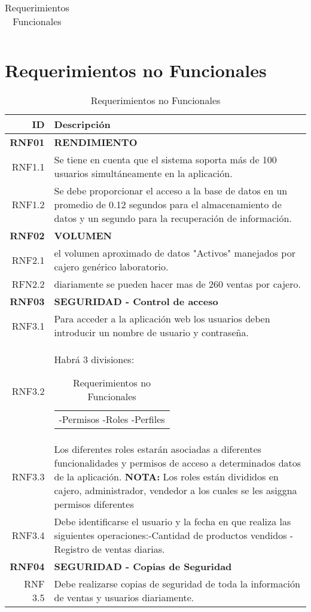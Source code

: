 \documentclass[a4paper,11pt, spanish]{report}
\makeatletter
\newcommand{\celda}[3][t]{%
  \begin{tabular}[#1]{@{}#2@{}}#3\end{tabular}}
\makeatother
\begin{document}
{{{{{{{{{{{{{\begin{longtable}{r|p{4.1in}}
    \caption{\\Requerimientos Funcionales}
    \end{longtable}
    
    \section{Requerimientos no Funcionales}
      {\renewcommand{\arraystretch}{1.25}%
      \begin{table}[H]
      \begin{tabularx}{\textwidth}{r|X}
      \textbf{\Large ID} & \textbf{\Large Descripción}\\\hline
      \textbf{\large RNF01} & \textbf{\large RENDIMIENTO}\\
      RNF1.1 & Se tiene en cuenta que el sistema soporta más de 100 usuarios simultáneamente en la aplicación.\\
      RNF1.2 & Se debe proporcionar el acceso a la base de datos en un promedio de 0.12 segundos para el almacenamiento de datos y un segundo para la recuperación de información.\\ \hline
      \textbf{\large RNF02} & \textbf{\large VOLUMEN}\\
      RNF2.1 & el volumen aproximado de datos "Activos" manejados por cajero genérico laboratorio.\\
      RFN2.2 & diariamente se pueden hacer mas de 260 ventas por cajero.\\\hline
      \textbf{\large RNF03} & \textbf{\large SEGURIDAD - Control de acceso}\\
      RNF3.1 & Para acceder a la aplicación web los usuarios deben introducir un nombre de usuario y contraseña.\\
      RNF3.2 & Habrá 3 divisiones:\celda{l}{\newline -Permisos \newline -Roles \newline -Perfiles}\\
      RNF3.3 & Los diferentes roles estarán asociadas a diferentes funcionalidades y permisos de acceso a determinados datos de la aplicación.\newline
      \textbf{NOTA:} Los roles están divididos en cajero, administrador, vendedor a los cuales se les asiggna permisos diferentes\\
      RNF3.4 & Debe identificarse el usuario y la fecha en que realiza las siguientes  operaciones:\newline -Cantidad de productos vendidos \newline -Registro de ventas diarias.\\ \hline
      \textbf{\large RNF04} & \textbf{\large SEGURIDAD - Copias de Seguridad}\\
      RNF 3.5 & Debe realizarse copias de seguridad de toda la información de ventas y usuarios diariamente.\\
      \end{tabularx}
      \caption{Requerimientos no Funcionales}
      \end{table}
    
}}}}}}}}}}}}}}
\end{document}

